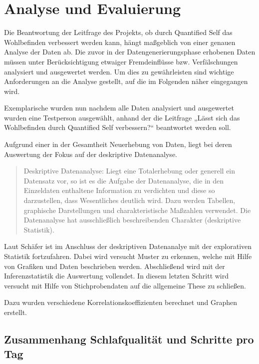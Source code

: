 
\chapter{Analyse und Evaluierung}
\label{ch:AnalyseUndEvaluierung}

Die Beantwortung der Leitfrage des Projekts, ob durch Quantified Self das Wohlbefinden verbessert werden kann, hängt maßgeblich von einer genauen Analyse der Daten ab. 
Die zuvor in der Datengenerierungsphase erhobenen Daten müssen unter Berücksichtigung etwaiger Fremdeinflüsse bzw. Verfälschungen analysiert und ausgewertet werden.
Um dies zu gewährleisten sind wichtige Anforderungen an die Analyse gestellt, auf die im Folgenden näher eingegangen wird.

Exemplarische wurden nun nachdem alle Daten analysiert und ausgewertet wurden eine Testperson ausgewählt, anhand der die Leitfrage „Lässt sich das Wohlbefinden durch Quantified Self verbessern?“ beantwortet werden soll.

Aufgrund einer in der Gesamtheit Neuerhebung von Daten, liegt bei deren Auswertung der Fokus auf der deskriptive Datenanalyse.

\begin{quote}
Deskriptive Datenanalyse: Liegt eine Totalerhebung oder generell ein Datensatz vor, so ist es die Aufgabe der Datenanalyse, die in den Einzeldaten enthaltene Information zu verdichten und diese so darzustellen, dass Wesentliches deutlich wird. Dazu werden Tabellen, graphische Darstellungen und charakteristische Maßzahlen verwendet.  Die Datenanalyse hat ausschließlich beschreibenden Charakter (deskriptive Statistik). 
\end{quote}
\cite{web:SpringerDatenanalyse}


Laut Schäfer\cite{Schafer2010} ist im Anschluss der deskriptiven Datenanalye mit der explorativen Statistik fortzufahren.
Dabei wird versucht Muster zu erkennen, welche mit Hilfe von Grafiken und Daten beschrieben werden.
Abschließend wird mit der Inferenzstatistik die Auswertung vollendet.
In diesem letzten Schritt wird versucht mit Hilfe von Stichprobendaten auf die allgemeine These zu schließen.

Dazu wurden verschiedene Korrelationskoeffizienten berechnet und Graphen erstellt.


\section{Zusammenhang Schlafqualität und Schritte pro Tag}
\label{ch:AnalyseUndEvaluierung:sec:ZusammenhangSchlafqualitätProSchrittenAmTag}

